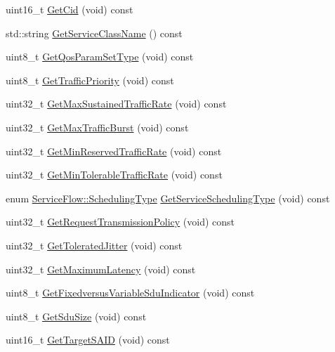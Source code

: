 \begin{DoxyCompactItemize}
uint16\+\_\+t \hyperlink{classns3_1_1ServiceFlow_aa1fd9d5f4f21db6a3ec1aac8c3e6958d}{Get\+Cid} (void) const 
\item 
std\+::string \hyperlink{classns3_1_1ServiceFlow_a9a11ebe7c09b34e0d4f09465b1c0a928}{Get\+Service\+Class\+Name} () const 
\item 
uint8\+\_\+t \hyperlink{classns3_1_1ServiceFlow_a04d32f2763457e14bde34180617319df}{Get\+Qos\+Param\+Set\+Type} (void) const 
\item 
uint8\+\_\+t \hyperlink{classns3_1_1ServiceFlow_a8e818b004aeff9d7714d0774846867a5}{Get\+Traffic\+Priority} (void) const 
\item 
uint32\+\_\+t \hyperlink{classns3_1_1ServiceFlow_ad02f7733f156cfd8505c72f8e4eab836}{Get\+Max\+Sustained\+Traffic\+Rate} (void) const 
\item 
uint32\+\_\+t \hyperlink{classns3_1_1ServiceFlow_af2314ccb8ff8fb93f537e5bccf6c16dc}{Get\+Max\+Traffic\+Burst} (void) const 
\item 
uint32\+\_\+t \hyperlink{classns3_1_1ServiceFlow_aa77c3b70a73e58377ff6103c8719f45c}{Get\+Min\+Reserved\+Traffic\+Rate} (void) const 
\item 
uint32\+\_\+t \hyperlink{classns3_1_1ServiceFlow_a6854fa39a107304708e4610a9df2053d}{Get\+Min\+Tolerable\+Traffic\+Rate} (void) const 
\item 
enum \hyperlink{classns3_1_1ServiceFlow_a7990ba10be1e098328fd1e6382a26235}{Service\+Flow\+::\+Scheduling\+Type} \hyperlink{classns3_1_1ServiceFlow_abfcdce94a1409b4951c3cae3cad85e9a}{Get\+Service\+Scheduling\+Type} (void) const 
\item 
uint32\+\_\+t \hyperlink{classns3_1_1ServiceFlow_a4d5e1a471cd64694264c0b3aa28129a6}{Get\+Request\+Transmission\+Policy} (void) const 
\item 
uint32\+\_\+t \hyperlink{classns3_1_1ServiceFlow_a6ad738defb5c78282e8ef6de07cdb4aa}{Get\+Tolerated\+Jitter} (void) const 
\item 
uint32\+\_\+t \hyperlink{classns3_1_1ServiceFlow_ae801a50e7f8f598b4e343d85a6e6f472}{Get\+Maximum\+Latency} (void) const 
\item 
uint8\+\_\+t \hyperlink{classns3_1_1ServiceFlow_a31ff3164f990eb7c37c09f99cb738258}{Get\+Fixedversus\+Variable\+Sdu\+Indicator} (void) const 
\item 
uint8\+\_\+t \hyperlink{classns3_1_1ServiceFlow_ab928d697abf7160b5bdf0be93371c085}{Get\+Sdu\+Size} (void) const 
\item 
uint16\+\_\+t \hyperlink{classns3_1_1ServiceFlow_aa5e94d7edefbdbd6e211c78bf17825b6}{Get\+Target\+S\+A\+ID} (void) const 

\end{DoxyCompactItemize}
